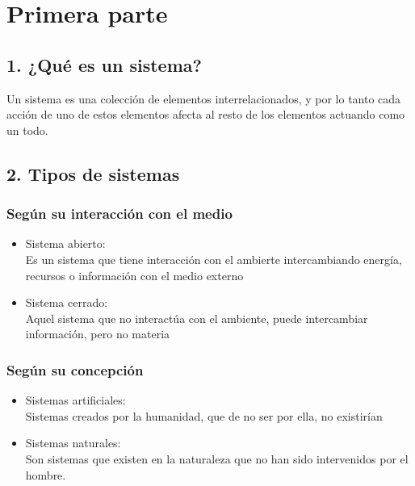 \documentclass[a4paper,man,natbib]{apa6}
\begin{document}


\section{Primera parte}
\subsection{1. ¿Qué es un sistema?}
Un sistema es una colección de elementos interrelacionados, y por lo tanto cada acción de uno de estos elementos afecta al resto de los elementos actuando como un todo. \citep{von1976teoria}


\subsection{2. Tipos de sistemas}
\subsubsection{Según su interacción con el medio}
\begin{itemize}
    \item Sistema abierto:\\
    Es un sistema que tiene interacción con el ambierte intercambiando energía, recursos o información con el medio externo\citep{10.2307/j.ctv1228hsw}
    \item Sistema cerrado:\\
    Aquel sistema que no interactúa con el ambiente, puede intercambiar información, pero no materia \citep{10.2307/j.ctv1228hsw}    
\end{itemize}

\subsubsection{Según su concepción}
\begin{itemize}
\item Sistemas artificiales:\\
    Sistemas creados por la humanidad, que de no ser por ella, no existirían \citep{10.2307/j.ctv1228hsw}
\item Sistemas naturales:\\
    Son sistemas que existen en la naturaleza que no han sido intervenidos por el hombre.
\end{itemize}
\end{document}
